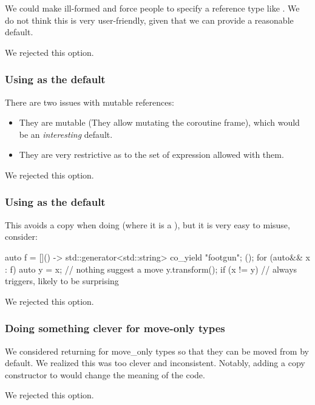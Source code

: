 \documentclass{wg21}
\begin{document}
We could make  ill-formed and force people to specify a reference type like .
We do not think this is very user-friendly, given that we can provide a reasonable default.

We rejected this option.

\subsubsection{Using  as the default}

There are two issues with mutable references:
\begin{itemize}
\item They are mutable (They allow mutating the coroutine frame), which would be an \emph{interesting} default.
\item They are very restrictive as to the set of  expression allowed with them.
\end{itemize}

We rejected this option.

\subsubsection{Using  as the default}

This avoids a copy when doing  (where it is a ),
but it is very easy to misuse, consider:

\begin{colorblock}
auto f = []() -> std::generator<std::string> { co_yield "footgun"; }();
for (auto&& x : f) {
    auto y = x; // nothing suggest a move
    y.transform();
    if (x != y) {
        // always triggers, likely to be surprising
    }
}
\end{colorblock}

We rejected this option.

\subsubsection{Doing something clever for move-only types}

We considered returning  for move_only types so that they can be moved from by default.
We realized this was too clever and inconsistent.
Notably, adding a copy constructor to  would change the meaning of the code.

We rejected this option.
\end{document}
